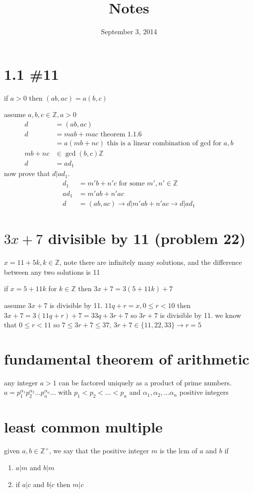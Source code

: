 \documentclass[letterpaper]{article}
\begin{document}
\title{Notes}
\date{September 3, 2014}
\maketitle
\section*{1.1 \#11}
if $a>0$ then $(ab,ac)=a(b,c)$

assume $a,b,c\in\mathbb{Z}, a>0$
\begin{align*}
  d&=(ab,ac)\\
  d&=mab+mac\text{ theorem 1.1.6}\\
  &=a(mb+nc)\text{ this is a linear combination of gcd for }a,b\\
  mb+nc&\in\gcd(b,c)\mathbb{Z}\\
  d&=ad_1
\end{align*}
now prove that $d|ad_1$.
\begin{align*}
  d_1&=m'b+n'c\text{ for some }m',n'\in\mathbb{Z}\\
  ad_1&=m'ab+n'ac\\
  d&=(ab,ac)\rightarrow d|m'ab+n'ac\rightarrow d|ad_1
\end{align*}
\section*{$3x+7$ divisible by 11 (problem 22)}
$x=11+5k,k\in\mathbb{Z}$, note there are infinitely many solutions, and the difference between any two solutions is 11

if $x=5+11k$ for $k\in\mathbb{Z}$ then $3x+7=3(5+11k)+7$

assume $3x+7$ is divisible by 11. $11q+r=x, 0\le r<10$ then $3x+7=3(11q+r)+7=33q+3r+7$ so $3r+7$ is divisible by 11. we know that $0\le r<11$ so $7\le 3r+7\le37$, $3r+7\in\{11,22,33\}\rightarrow r=5$ 
\section*{fundamental  theorem of arithmetic}
any integer $a>1$ can be factored uniquely as a product of prime numbers. $a=p_1^{\alpha_1}p_2^{\alpha_2}...p_n^{\alpha_n}...$ with $p_1<p_2<...<p_n$ and $\alpha_1,\alpha_2,...\alpha_n$ positive integers
\section*{least common multiple}
given $a,b\in\mathbb{Z}^+$, we say that the positive integer $m$ is the lcm of $a$ and $b$ if
\begin{enumerate}
\item
$a|m$ and $b|m$
\item
if $a|c$ and $b|c$ then $m|c$
\end{enumerate}
\end{document}
